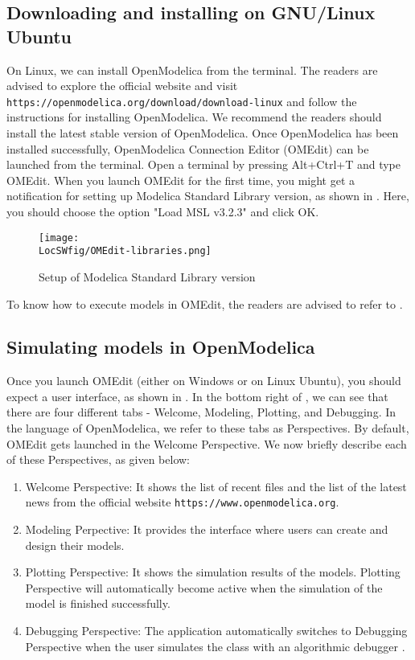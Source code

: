 \subsection{Downloading and installing on GNU/Linux Ubuntu} \label{openmodelica-install-linux}
On Linux, we can install OpenModelica from the terminal. The readers are advised to explore the official website and visit 
{\tt https://openmodelica.org/download/download-linux} and follow the instructions for installing OpenModelica.
We recommend the readers should install the latest stable version of OpenModelica. 
Once OpenModelica has been installed successfully, OpenModelica Connection Editor (OMEdit) can be launched
from the terminal. Open a terminal by pressing Alt+Ctrl+T and type OMEdit. When you 
launch OMEdit for the first time, you might get a notification for setting up 
Modelica Standard Library version, as shown in . Here, you 
should choose the option "Load MSL v3.2.3" and click OK.  
\begin{figure}
      \centering
      \texttt{[image: \\LocSWfig/OMEdit-libraries.png]}
      \caption{Setup of Modelica Standard Library version}
      \label{om-help}
\end{figure}
To know how to execute models in OMEdit, the readers are advised to refer to . 

\subsection{Simulating models in OpenModelica}\label{OpenModelica-code-execution}
Once you launch OMEdit (either on Windows or on Linux Ubuntu), you should expect a user interface, 
as shown in . In the bottom right of , we can 
see that there are four different tabs - Welcome, Modeling, Plotting, and 
Debugging. In the language of OpenModelica, we refer to these tabs as Perspectives. 
By default, OMEdit gets launched in the Welcome Perspective. We now briefly describe each 
of these Perspectives, as given below:
\begin{enumerate}
      \item Welcome Perspective: It shows the list of recent files and the list of the 
      latest news from the official website {\tt https://www.openmodelica.org}.
      \item Modeling Perpective: It provides the interface where users can 
      create and design their models.
      \item Plotting Perspective: It shows the simulation results of the models. 
      Plotting Perspective will automatically become active 
      when the simulation of the model is finished successfully.
      \item Debugging Perspective: The application automatically switches to Debugging Perspective 
      when the user simulates the class with an algorithmic debugger \cite{om-ref}.
\end{enumerate}

